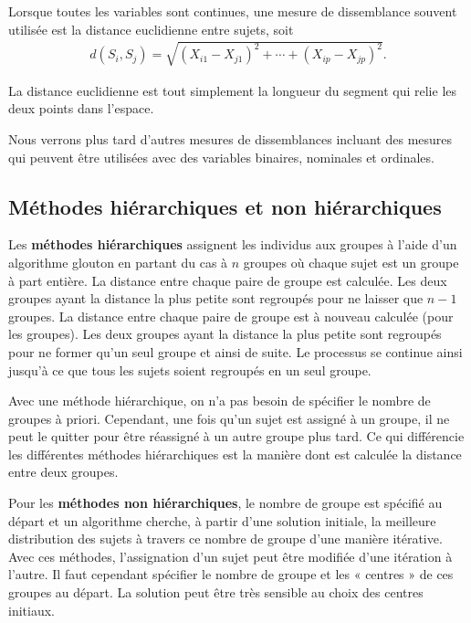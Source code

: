 \documentclass[
  11pt,
  letterpaper,
]{book}
\theoremstyle{definition}
\theoremstyle{definition}
\theoremstyle{definition}
\theoremstyle{remark}
\begin{document}
Lorsque toutes les variables sont continues, une mesure de dissemblance souvent utilisée est la distance euclidienne entre sujets, soit
\begin{align*}
d(S_i, S_j) = \sqrt{(X_{i1}-X_{j1})^2 + \cdots + (X_{ip}-X_{jp})^2}.
\end{align*}

La distance euclidienne est tout simplement la longueur du segment qui relie les deux points dans l'espace.

Nous verrons plus tard d'autres mesures de dissemblances incluant des mesures qui peuvent être utilisées avec des variables binaires, nominales et ordinales.

\hypertarget{muxe9thodes-hiuxe9rarchiques-et-non-hiuxe9rarchiques}{%
\subsection{Méthodes hiérarchiques et non hiérarchiques}\label{muxe9thodes-hiuxe9rarchiques-et-non-hiuxe9rarchiques}}

Les \textbf{méthodes hiérarchiques} assignent les individus aux groupes à l'aide d'un algorithme glouton en partant du cas à \(n\) groupes où chaque sujet est un groupe à part entière. La distance entre chaque paire de groupe est calculée. Les deux groupes ayant la distance la plus petite sont regroupés pour ne laisser que \(n-1\) groupes. La distance entre chaque paire de groupe est à nouveau calculée (pour les groupes). Les deux groupes ayant la distance la plus petite sont regroupés pour ne former qu'un seul groupe et ainsi de suite. Le processus se continue ainsi jusqu'à ce que tous les sujets soient regroupés en un seul groupe.

Avec une méthode hiérarchique, on n'a pas besoin de spécifier le nombre de groupes à priori. Cependant, une fois qu'un sujet est assigné à un groupe, il ne peut le quitter pour être réassigné à un autre groupe plus tard. Ce qui différencie les différentes méthodes hiérarchiques est la manière dont est calculée la distance entre deux groupes.

Pour les \textbf{méthodes non hiérarchiques}, le nombre de groupe est spécifié au départ et un algorithme cherche, à partir d'une solution initiale, la meilleure distribution des sujets à travers ce nombre de groupe d'une manière itérative. Avec ces méthodes, l'assignation d'un sujet peut être modifiée d'une itération à l'autre. Il faut cependant spécifier le nombre de groupe et les « centres » de ces groupes au départ. La solution peut être très sensible au choix des centres initiaux.
\end{document}
